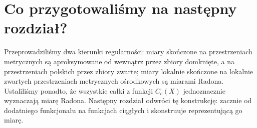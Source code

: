 \section{Co przygotowaliśmy na następny rozdział?}
Przeprowadziliśmy dwa kierunki regularności:
miary skończone na przestrzeniach metrycznych są
aproksymowane od wewnątrz przez zbiory domknięte,
a na przestrzeniach polskich przez zbiory zwarte;
miary lokalnie skończone na lokalnie zwartych
przestrzeniach metrycznych ośrodkowych są miarami Radona.
Ustaliliśmy ponadto, że wszystkie całki z funkcji
$C_c(X)$ jednoznacznie wyznaczają miarę Radona.
Następny rozdział odwróci tę konstrukcję:
zacznie od dodatniego funkcjonału na funkcjach ciągłych
i skonstruuje reprezentującą go miarę.
